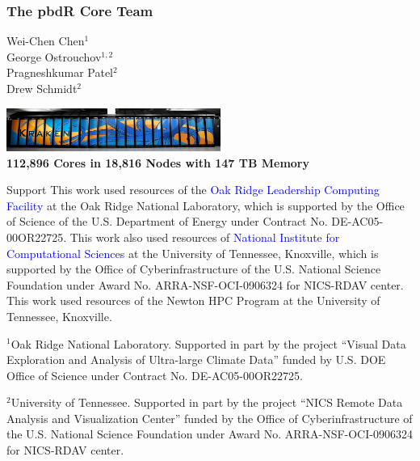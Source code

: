\frame{
  \maketitle
}

\setcounter{footnote}{0}
\begin{frame}[noframenumbering]
\frametitle{The pbdR Core Team}
\begin{minipage}{3.6cm}
Wei-Chen Chen$^1$ \\
George Ostrouchov$^{1,2}$ \\
Pragneshkumar Patel$^2$ \\
Drew Schmidt$^2$ \\[2ex]
\end{minipage}
\begin{minipage}{7cm}
  \includegraphics[width=7cm]{../common/pics/kraken1wide} \\
  \tiny\bf 112,896 Cores in 18,816 Nodes with 147 TB Memory \\
\end{minipage}

\vspace{-1.5em}
\begin{block}{Support}\tiny
  This work used resources of the \textcolor{blue}{Oak Ridge
    Leadership Computing Facility} at the Oak Ridge National
  Laboratory, which is supported by the Office of Science of the
  U.S. Department of Energy under Contract No. DE-AC05-00OR22725. This
  work also used resources of \textcolor{blue}{National Institute for
    Computational Sciences} at the University of Tennessee, Knoxville,
  which is supported by the Office of Cyberinfrastructure of the
  U.S. National Science Foundation under Award
  No. ARRA-NSF-OCI-0906324 for NICS-RDAV center. This work used
  resources of the Newton HPC Program at the University of Tennessee,
  Knoxville.

  \tiny \vspace{1em}$^1$Oak Ridge National Laboratory. Supported in
  part by the project ``Visual Data Exploration and Analysis of
  Ultra-large Climate Data'' funded by U.S. DOE Office of Science
  under Contract No. DE-AC05-00OR22725.

  \vspace{1em}$^2$University of Tennessee. Supported in part by the
  project ``NICS Remote Data Analysis and Visualization Center''
  funded by the Office of Cyberinfrastructure of the U.S. National
  Science Foundation under Award No. ARRA-NSF-OCI-0906324 for
  NICS-RDAV center.
\end{block}
\end{frame}

